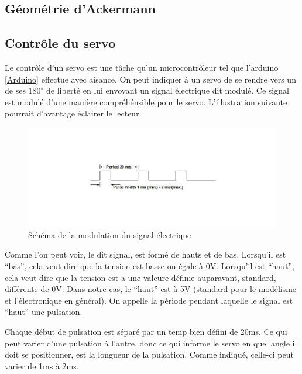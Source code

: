 \documentclass[a4paper,11pt]{report}
\begin{document}
{\subsection{Géométrie d'Ackermann}

\subsection{Contrôle du servo}
Le contr\^ole d'un servo est une tâche qu'un microcontr\^oleur tel que
l'arduino \ref{Arduino} effectue avec aisance. On peut indiquer \`a un servo de se rendre vers
un de ses $180^{\circ}$ de libert\'e en lui envoyant un signal \'electrique dit
modul\'e. Ce signal est modul\'e d'une mani\`ere compréh\'ensible pour le
servo. L'illustration suivante
pourrait d'avantage \'eclairer le lecteur.

\begin{figure}[h]
\centering
\includegraphics[width=1.0\textwidth]{figures/ServoPwm}
    \caption{\label{ServoPwm}Sch\'ema de la modulation du signal
      \'electrique \protect
      \cite{WikiServo}
    }
\end{figure}

Comme l'on peut voir, le dit signal, est form\'e de hauts et de
bas. Lorsqu'il est ``bas'', cela veut dire que la tension est basse ou \'egale
\`a 0V. Lorsqu'il est
``haut'', cela veut dire que la tension est a une valeure d\'efinie auparavant,
standard, diff\'erente de 0V. Dans notre cas, le ``haut'' est \`a 5V (standard
pour le mod\'elisme et l'\'electronique en g\'en\'eral). On appelle la
p\'eriode pendant laquelle le signal est ``haut'' une pulsation.

Chaque d\'ebut de pulsation est s\'epar\'e par un temp bien d\'efini de
20ms. Ce qui peut varier d'une pulsation \`a l'autre, donc ce qui informe le
servo en quel angle il doit se positionner, est la longueur de la
pulsation. Comme indiqu\'e, celle-ci peut varier de 1ms \`a 2ms.

}
\end{document}
